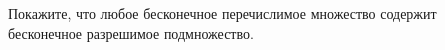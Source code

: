 Покажите, что любое бесконечное перечислимое множество содержит бесконечное разрешимое подмножество.